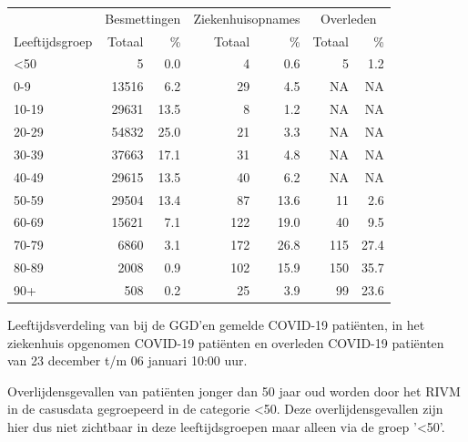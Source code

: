 \documentclass[
  english,
  man,floatsintext]{apa6}
\begin{document}
\begin{table}
\centering\begingroup\fontsize{11}{13}\selectfont

\begin{threeparttable}
\begin{tabular}{lrrrrrr}
\toprule
\multicolumn{1}{c}{ } & \multicolumn{2}{c}{Besmettingen} & \multicolumn{2}{c}{Ziekenhuisopnames} & \multicolumn{2}{c}{Overleden} \\
\cmidrule(l{3pt}r{3pt}){2-3} \cmidrule(l{3pt}r{3pt}){4-5} \cmidrule(l{3pt}r{3pt}){6-7}
Leeftijdsgroep & Totaal & \% & Totaal & \% & Totaal & \%\\
\midrule
<50 & 5 & 0.0 & 4 & 0.6 & 5 & 1.2\\
0-9 & 13516 & 6.2 & 29 & 4.5 & NA & NA\\
10-19 & 29631 & 13.5 & 8 & 1.2 & NA & NA\\
20-29 & 54832 & 25.0 & 21 & 3.3 & NA & NA\\
30-39 & 37663 & 17.1 & 31 & 4.8 & NA & NA\\
40-49 & 29615 & 13.5 & 40 & 6.2 & NA & NA\\
50-59 & 29504 & 13.4 & 87 & 13.6 & 11 & 2.6\\
60-69 & 15621 & 7.1 & 122 & 19.0 & 40 & 9.5\\
70-79 & 6860 & 3.1 & 172 & 26.8 & 115 & 27.4\\
80-89 & 2008 & 0.9 & 102 & 15.9 & 150 & 35.7\\
90+ & 508 & 0.2 & 25 & 3.9 & 99 & 23.6\\
\bottomrule
\end{tabular}
\begin{tablenotes}
\item[1] Leeftijdsverdeling van bij de GGD’en gemelde COVID-19 patiënten, in het ziekenhuis opgenomen COVID-19 patiënten en overleden COVID-19 patiënten van 23 december t/m 06 januari 10:00 uur.
\item[2] Overlijdensgevallen van patiënten jonger dan 50 jaar oud worden door het RIVM in de casusdata gegroepeerd in de categorie <50. Deze overlijdensgevallen zijn hier dus niet zichtbaar in deze leeftijdsgroepen maar alleen via de groep '<50'.
\end{tablenotes}
\end{threeparttable}
\endgroup{}
\end{table}

\newpage
\end{document}
